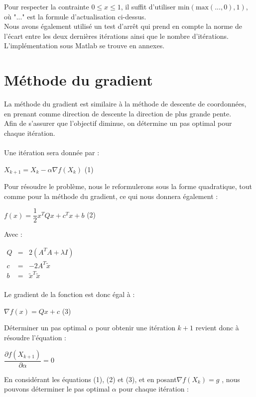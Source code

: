 \documentclass[12pt, a4paper]{report}
\begin{document}
Pour respecter la contrainte $0 \leq x \leq 1$, il suffit d'utiliser \(\text{min}(\text{max}(..., 0), 1)\), où "..." est la formule d'actualisation ci-dessus. \\

Nous avons également utilisé un test d'arrêt qui prend en compte la norme de l'écart entre les deux dernières itérations ainsi que le nombre d'itérations. \\
L'implémentation sous Matlab se trouve en annexes.

\section{Méthode du gradient}
La méthode du gradient est similaire à la méthode de descente de coordonnées, en prenant comme direction de descente la direction de plus grande pente.\\
Afin de s'assurer que l'objectif diminue, on détermine un pas optimal pour chaque itération.\\
\\Une itération sera donnée par :
\begin{center}
$X_{k+1}=X_k - \alpha \nabla f(X_k)$ (1)
\end{center}
Pour résoudre le problème, nous le reformulerons sous la forme quadratique, tout comme pour la méthode du gradient, ce qui nous donnera également :
\begin{center}
$f(x) = \dfrac{1}{2}x^TQx + c^Tx + b$ (2)
\end{center}
Avec :
\begin{flushleft}
$\begin{array}{rcl}
Q & = & 2(A^TA + \lambda I) \\
c & = & -2A^T\tilde{x} \\
b & = & \tilde{x}^T\tilde{x} \\
\end{array}$
\end{flushleft}
Le gradient de la fonction est donc égal à :
\begin{center}
$\nabla f(x) = Qx + c$ (3)
\end{center}
Déterminer un pas optimal $\alpha$ pour obtenir une itération $k + 1$ revient donc à résoudre l'équation :
\begin{center}
$\dfrac{\partial f(X_{k+1})}{\partial \alpha} = 0$
\end{center}
En considérant les équations (1), (2) et (3), et en posant$\nabla f(X_k) = g$ , nous pouvons déterminer le pas optimal $\alpha$ pour chaque itération :
\end{document}
